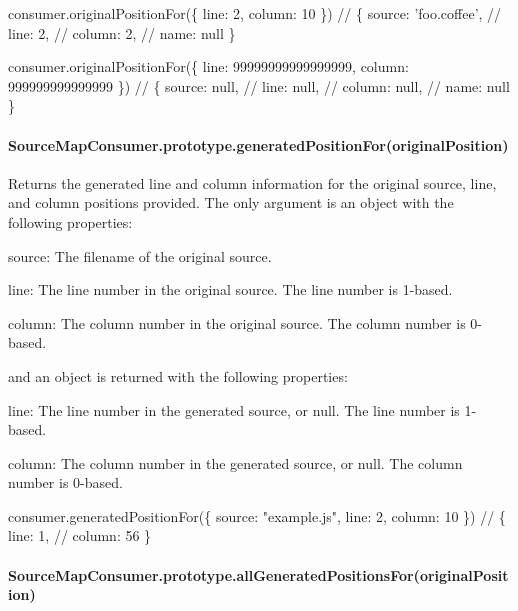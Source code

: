 \begin{DoxyCode}
consumer.originalPositionFor(\{ line: 2, column: 10 \})
// \{ source: 'foo.coffee',
//   line: 2,
//   column: 2,
//   name: null \}

consumer.originalPositionFor(\{ line: 99999999999999999, column: 999999999999999 \})
// \{ source: null,
//   line: null,
//   column: null,
//   name: null \}
\end{DoxyCode}


\paragraph*{Source\+Map\+Consumer.\+prototype.\+generated\+Position\+For(original\+Position)}

Returns the generated line and column information for the original source, line, and column positions provided. The only argument is an object with the following properties\+:


\begin{DoxyItemize}
\item {\ttfamily source}\+: The filename of the original source.
\item {\ttfamily line}\+: The line number in the original source. The line number is 1-\/based.
\item {\ttfamily column}\+: The column number in the original source. The column number is 0-\/based.
\end{DoxyItemize}

and an object is returned with the following properties\+:


\begin{DoxyItemize}
\item {\ttfamily line}\+: The line number in the generated source, or null. The line number is 1-\/based.
\item {\ttfamily column}\+: The column number in the generated source, or null. The column number is 0-\/based.
\end{DoxyItemize}


\begin{DoxyCode}
consumer.generatedPositionFor(\{ source: "example.js", line: 2, column: 10 \})
// \{ line: 1,
//   column: 56 \}
\end{DoxyCode}


\paragraph*{Source\+Map\+Consumer.\+prototype.\+all\+Generated\+Positions\+For(original\+Position)}

